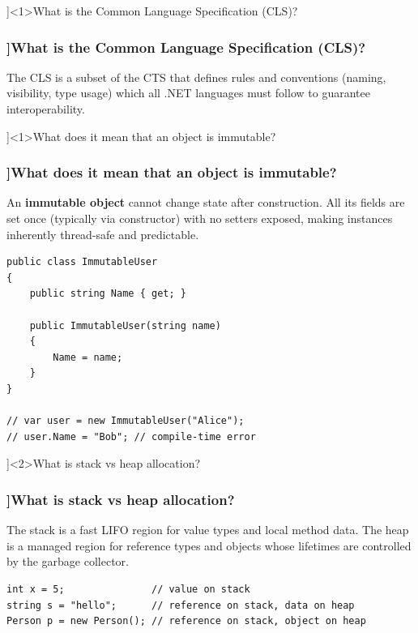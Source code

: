 \QuestionSlide[\CategoryBadge[MemoryColor!20]{Types \& Memory}]<1>{What is the Common Language Specification (CLS)?}
\begin{frame}[fragile]
  \frametitle{\AnswerTitle[\CategoryBadge[MemoryColor!20]{Types \& Memory}]{What is the Common Language Specification (CLS)?}}

  {\footnotesize
    The CLS is a subset of the CTS that defines rules and conventions (naming, visibility, type usage) which all .NET languages must follow to guarantee interoperability.
  }
\end{frame}

\QuestionSlide[\CategoryBadge[MemoryColor!20]{Types \& Memory}]<1>{What does it mean that an object is immutable?}
\begin{frame}[fragile]
  \frametitle{\AnswerTitle[\CategoryBadge[MemoryColor!20]{Types \& Memory}]{What does it mean that an object is immutable?}}

  {\footnotesize
    An \textbf{immutable object} cannot change state after construction. All its fields are set once (typically via constructor) with no setters exposed, making instances inherently thread-safe and predictable.
  }

  \begin{verbatim}
public class ImmutableUser
{
    public string Name { get; }

    public ImmutableUser(string name)
    {
        Name = name;
    }
}

// var user = new ImmutableUser("Alice");
// user.Name = "Bob"; // compile-time error
  \end{verbatim}
\end{frame}

\QuestionSlide[\CategoryBadge[MemoryColor!20]{Types \& Memory}]<2>{What is stack vs heap allocation?}
\begin{frame}[fragile]
  \frametitle{\AnswerTitle[\CategoryBadge[MemoryColor!20]{Types \& Memory}]{What is stack vs heap allocation?}}

  {\footnotesize
    The stack is a fast LIFO region for value types and local method data. The heap is a managed region for reference types and objects whose lifetimes are controlled by the garbage collector.
  }

  \begin{verbatim}
int x = 5;               // value on stack
string s = "hello";      // reference on stack, data on heap
Person p = new Person(); // reference on stack, object on heap
  \end{verbatim}
\end{frame}


